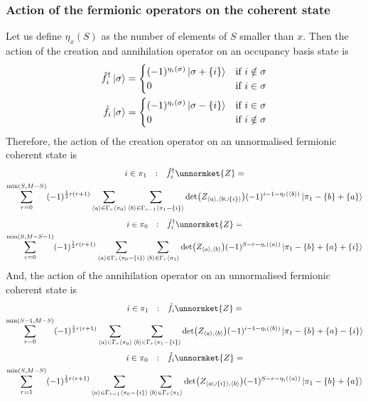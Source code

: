 \documentclass[12pt]{article}
\newcommand{\seq}[1]{\langle #1\rangle}
\newcommand{\hc}{^\dagger}
\begin{document}
	\subsubsection{Action of the fermionic operators on the coherent state}
	Let us define $\eta_x(S)$ as the number of elements of $S$ smaller than $x$. Then the action of the creation and annihilation operator on an occupancy basis state is
	\begin{eqnarray}
	\hat{f}\hc_i\ket{\sigma}=\begin{cases}
		(-1)^{\eta_i(\sigma)}\ket{\sigma + \{i\}} & \text{if }i\notin\sigma\\
		0 & \text{if }i\in\sigma
	\end{cases}\\
	\hat{f}_i\ket{\sigma}=\begin{cases}
		(-1)^{\eta_i(\sigma)}\ket{\sigma - \{i\}} & \text{if }i\in\sigma\\
		0 & \text{if }i\notin\sigma
	\end{cases}
	\end{eqnarray}
	Therefore, the action of the creation operator on an unnormalised fermionic coherent state is
	\begin{multline}
	i\in\pi_1\qq{:}\hat{f}\hc_{i}\unnormket{Z}=\\
	\sum_{r=0}^{\min(S,M-S)}(-1)^{\frac{1}{2}r(r+1)}\sum_{\seq{a}\in\Gamma_{r}\seq{\pi_0}}\sum_{\seq{b}\in\Gamma_{r-1}\seq{\pi_1-\{i\}}}\det(Z_{\seq{a},\seq{b\cup\{i\}}})(-1)^{i-1-\eta_i(\seq{b})}\ket{\pi_1-\{b\}+\{a\}}
	\end{multline}
	\begin{multline}
	i\in\pi_0\qq{:}\hat{f}\hc_{i}\unnormket{Z}=\\
	\sum_{r=0}^{\min(S,M-S-1)}(-1)^{\frac{1}{2}r(r+1)}\sum_{\seq{a}\in\Gamma_{r}\seq{\pi_0-\{i\}}}\sum_{\seq{b}\in\Gamma_{r}\seq{\pi_1}}\det(Z_{\seq{a},\seq{b}})(-1)^{S-r-\eta_i(\seq{a})}\ket{\pi_1-\{b\}+\{a\}+\{i\}}
	\end{multline}
	And, the action of the annihilation operator on an unnormalised fermionic coherent state is
	\begin{multline} \label{eq: pi_1 reduction action}
	i\in\pi_1\qq{:}\hat{f}_{i}\unnormket{Z}=\\
	\sum_{r=0}^{\min(S-1,M-S)}(-1)^{\frac{1}{2}r(r+1)}\sum_{\seq{a}\in\Gamma_r\seq{\pi_0}}\sum_{\seq{b}\in\Gamma_r\seq{\pi_1-\{i\}}}\det(Z_{\seq{a},\seq{b}})(-1)^{i-1-\eta_i(\seq{b})}\ket{\pi_1-\{b\}+\{a\}-\{i\}}
	\end{multline}
	\begin{multline} \label{eq: pi_0 reduction action}
	i\in\pi_0\qq{:}\hat{f}_{i}\unnormket{Z}=\\
	\sum_{r=1}^{\min(S,M-S)}(-1)^{\frac{1}{2}r(r+1)}\sum_{\seq{a}\in\Gamma_{r-1}\seq{\pi_0-\{i\}}}\sum_{\seq{b}\in\Gamma_r\seq{\pi_1}}\det(Z_{\seq{a\cup\{i\}},\seq{b}})(-1)^{S-r-\eta_i(\seq{a})}\ket{\pi_1-\{b\}+\{a\}}
	\end{multline}
\end{document}
